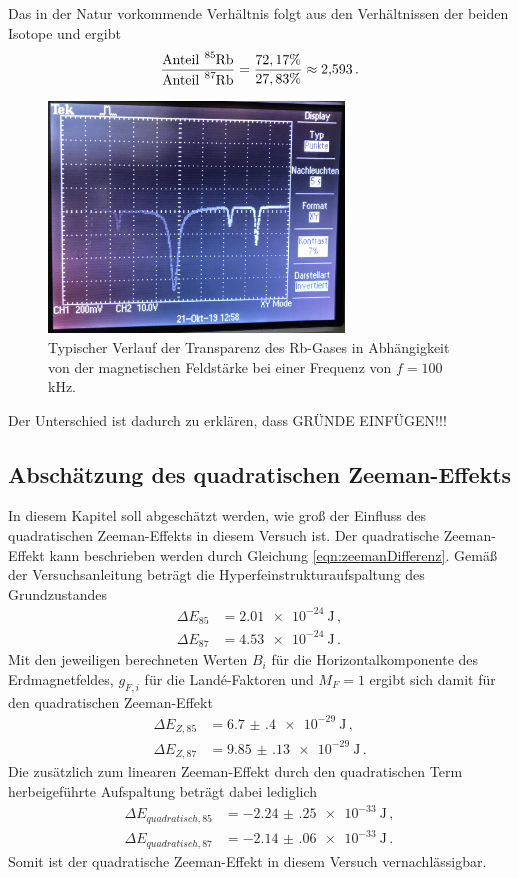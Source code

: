 Das in der Natur vorkommende Verhältnis folgt aus den Verhältnissen der beiden Isotope \cite{verhältnis}
und ergibt
\begin{equation}
  \frac{\text{Anteil}~ \ce{^{85}Rb}}{\text{Anteil}~ \ce{^{87}Rb}}=\frac{72,17\%}{27,83\%} \approx 2{,}593 \,.
\end{equation}

\begin{figure}
  \centering
  \includegraphics[width=0.7\textwidth]{data/foto.jpg}
  \caption{Typischer Verlauf der Transparenz des Rb-Gases in Abhängigkeit von der magnetischen Feldstärke bei einer Frequenz von $f=100\,$kHz.}
  \label{fig:foto}
\end{figure}

Der Unterschied ist dadurch zu erklären, dass GRÜNDE EINFÜGEN!!!

\subsection{Abschätzung des quadratischen Zeeman-Effekts}
\label{subsec:zeeman}
In diesem Kapitel soll abgeschätzt werden, wie groß der Einfluss des quadratischen Zeeman-Effekts
in diesem Versuch ist. Der quadratische Zeeman-Effekt kann beschrieben werden durch Gleichung
\eqref{eqn:zeemanDifferenz}. Gemäß der Versuchsanleitung \cite{Versuchsanleitung} beträgt die
Hyperfeinstrukturaufspaltung des Grundzustandes
\begin{align*}
  \Delta E_{85}&= \SI{2.01e-24}{\joule}\,,\\
  \Delta E_{87}&= \SI{4.53e-24}{\joule}\,.
\end{align*}
Mit den jeweiligen berechneten Werten $B_i$ für die Horizontalkomponente des Erdmagnetfeldes,
$g_{F,i}$ für die Landé-Faktoren und $M_F=1$ ergibt sich damit für den quadratischen Zeeman-Effekt
\begin{align*}
  \Delta E_{Z,85}&=\SI{6.7(4)e-29}{\joule}\,,\\
  \Delta E_{Z,87}&=\SI{9.85(13)e-29}{\joule}\,.
\end{align*}
Die zusätzlich zum linearen Zeeman-Effekt durch den quadratischen Term herbeigeführte Aufspaltung beträgt dabei lediglich
\begin{align*}
  \Delta E_{quadratisch,85}&=\SI{-2.24(25)e-33}{\joule}\,,\\
  \Delta E_{quadratisch,87}&=\SI{-2.14(06)e-33}{\joule}\,.
\end{align*}
Somit ist der quadratische Zeeman-Effekt in diesem Versuch vernachlässigbar.


